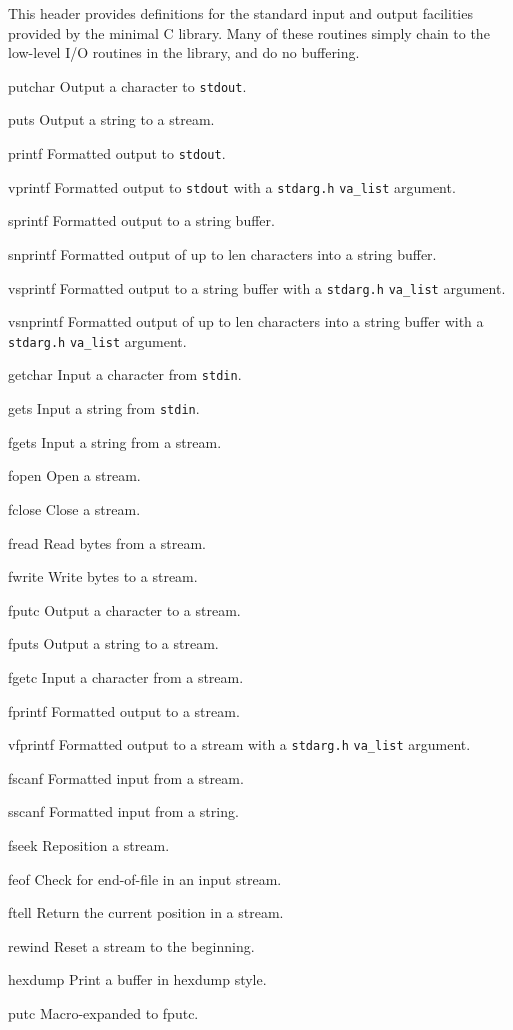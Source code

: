 \label{stdio-h}
\begin{apidesc}
	This header provides definitions for the standard input and output
	facilities provided by the minimal C library. Many of these routines
	simply chain to the low-level I/O routines in the \posix{} library,
	and do no buffering. 
	\begin{icsymlist}
		\item[putchar]
			Output a character to {\tt stdout}.
		\item[puts]
			Output a string to a stream.
		\item[printf]
			Formatted output to {\tt stdout}.
		\item[vprintf]
			Formatted output to {\tt stdout} with a
			{\tt stdarg.h} {\tt va_list} argument.
		\item[sprintf]
			Formatted output to a string buffer.
		\item[snprintf]
			Formatted output of up to len characters into a string
			buffer.
		\item[vsprintf]
			Formatted output to a string buffer with a
			{\tt stdarg.h} {\tt va_list} argument.
		\item[vsnprintf]
			Formatted output of up to len characters into a string
			buffer with a
			{\tt stdarg.h} {\tt va_list} argument.
		\item[getchar]
			Input a character from {\tt stdin}.
		\item[gets]
			Input a string from {\tt stdin}.
		\item[fgets]
			Input a string from a stream.
		\item[fopen]
			Open a stream.
		\item[fclose]
			Close a stream.
		\item[fread]
			Read bytes from a stream.
		\item[fwrite]
			Write bytes to a stream.
		\item[fputc]
			Output a character to a stream.
		\item[fputs]
			Output a string to a stream.
		\item[fgetc]
			Input a character from a stream.
		\item[fprintf]
			Formatted output to a stream.
		\item[vfprintf]
			Formatted output to a stream with a
			{\tt stdarg.h} {\tt va_list} argument.
		\item[fscanf]
			Formatted input from a stream.
		\item[sscanf]
			Formatted input from a string.
		\item[fseek]
			Reposition a stream.
		\item[feof]
			Check for end-of-file in an input stream.
		\item[ftell]
			Return the current position in a stream.
		\item[rewind]
			Reset a stream to the beginning.
		\item[hexdump]
			Print a buffer in hexdump style.
		\item[putc]
			Macro-expanded to fputc.
	\end{icsymlist}

\end{apidesc}

